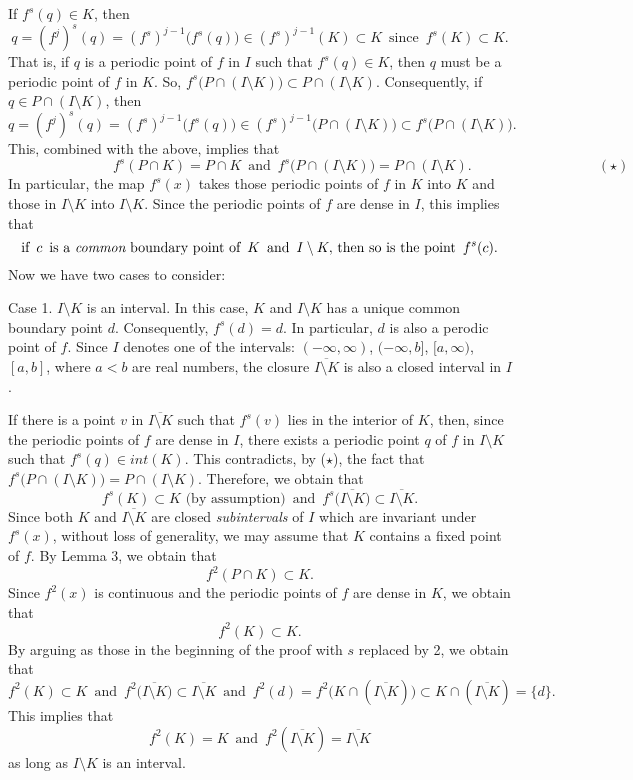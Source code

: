 \documentclass[12pt]{article}
\begin{document}
If $f^s(q) \in K$, then $$q = (f^j)^s(q) = (f^s)^{j-1}\big(f^s(q)\big) \in (f^s)^{j-1}(K) \subset K \,\,\, \text{since} \,\,\, f^s(K) \subset K.$$  That is, if $q$ is a periodic point of $f$ in $I$ such that $f^s(q) \in K$, then $q$ must be a periodic point of $f$ in $K$.  So, $f^s\big(P \cap (I \setminus K)\big) \subset P \cap (I \setminus K)$.  Consequently, if $q \in P \cap (I \setminus K)$, then 
$$
q = (f^j)^s(q) = (f^s)^{j-1}\big(f^s(q)\big) \in (f^s)^{j-1}\big(P \cap (I \setminus K)\big) \subset f^s\big(P \cap (I \setminus K)\big).
$$ 
This, combined with the above, implies that 
$$
\quad\qquad\qquad\qquad\,\,\, f^s(P \cap K) = P \cap K \,\,\, \text{and} \,\,\, f^s\big(P \cap (I \setminus K)\big) = P \cap (I \setminus K). \quad\qquad\qquad\qquad\qquad (\star)
$$
In particular, the map $f^s(x)$ takes those periodic points of $f$ in $K$ into $K$ and those in $I \setminus K$ into $I \setminus K$.  Since the periodic points of $f$ are dense in $I$, this implies that
$$
\text{if} \,\,\, c \,\,\, \text{is a {\it common} boundary point of} \,\,\, K \,\,\, \text{and} \,\,\, I \setminus K, \, \text{then so is the point} \,\,\, f^s(c).
$$  
\indent Now we have two cases to consider:

Case 1. $I \setminus K$ is an interval.  In this case, $K$ and $I \setminus K$ has a unique common boundary point $d$.  Consequently, $f^s(d) = d$.  In particular, $d$ is also a perodic point of $f$.  Since $I$ denotes one of the intervals: $(-\infty, \infty)$, $(-\infty, b]$, $[a, \infty)$, $[a, b]$, where $a < b$ are real numbers, the closure $\overline{I \setminus K}$ is also a closed interval in $I$.

If there is a point $v$ in $\overline{I \setminus K}$ such that $f^s(v)$ lies in the interior of $K$, then, since the periodic points of $f$ are dense in $I$, there exists a periodic point $q$ of $f$ in $I \setminus K$ such that $f^s(q) \in int(K)$.  This contradicts, by ($\star$), the fact that $f^s\big(P \cap (I \setminus K)\big) = P \cap (I \setminus K)$.  Therefore, we obtain that 
$$
f^s(K) \subset K \,\, \text{(by assumption)} \,\,\, \text{and} \,\,\,  f^s\big(\overline{I \setminus K}\big) \subset \overline{I \setminus K}.
$$  
Since both $K$ and $\overline{I \setminus K}$ are closed {\it subintervals} of $I$ which are invariant under $f^s(x)$, without loss of generality, we may assume that $K$ contains a fixed point of $f$.  By Lemma 3, we obtain that 
$$
f^2(P \cap K) \subset K.
$$
\indent Since $f^2(x)$ is continuous and the periodic points of $f$ are dense in $K$, we obtain that 
$$
f^2(K) \subset K.
$$  
By arguing as those in the beginning of the proof with $s$ replaced by 2, we obtain that 
$$
f^2(K) \subset K \,\,\, \text{and} \,\,\, f^2\big(\overline{I \setminus K}\big) \subset \overline{I \setminus K} \,\,\, \text{and} \,\,\, f^2(d) = f^2\big(K \cap (\overline{I \setminus K})\big) \subset K \cap (\overline{I \setminus K}) = \{ d \}.
$$
This implies that 
$$
f^2(K) = K \,\,\, \text{and} \,\,\, f^2(\overline{I \setminus K}) = \overline{I \setminus K}
$$
as long as $I \setminus K$ is an interval. 
\end{document}
